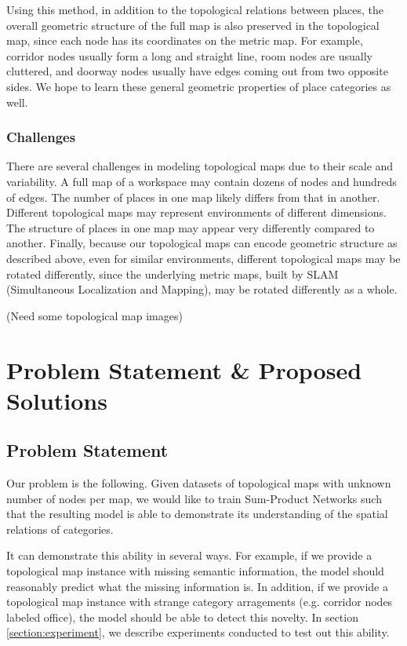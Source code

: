 \documentclass[10pt, titlepage]{article}
\theoremstyle{definition}
\begin{document}
Using this method, in addition to the topological relations between places, the overall geometric structure of the full map is also preserved in the topological map, since each node has its coordinates on the metric map. For example, corridor nodes usually form a long and straight line, room nodes are usually cluttered, and doorway nodes usually have edges coming out from two opposite sides. We hope to learn these general geometric properties of place categories as well.

\subsubsection{Challenges}
There are several challenges in modeling topological maps due to their scale and variability. A full map of a workspace may contain dozens of nodes and hundreds of edges. The number of places in one map likely differs from that in another. Different topological maps may represent environments of different dimensions. The structure of places in one map may appear very differently compared to another. Finally, because our topological maps can encode geometric structure as described above, even for similar environments, different topological maps may be rotated differently, since the underlying metric maps, built by SLAM (Simultaneous Localization and Mapping), may be rotated differently as a whole.

(Need some topological map images)

\section{Problem Statement \& Proposed Solutions}\label{section:sol}
\subsection{Problem Statement}\label{section:problem}

Our problem is the following. Given datasets of topological maps with unknown number of nodes per map, we would like to train Sum-Product Networks such that the resulting model is able to demonstrate its understanding of the spatial relations of categories.

It can demonstrate this ability in several ways. For example, if we provide a topological map instance with missing semantic information, the model should reasonably predict what the missing information is. In addition, if we provide a topological map instance with strange category arragements (e.g. corridor nodes labeled office), the model should be able to detect this novelty. In section \ref{section:experiment}, we describe experiments conducted to test out this ability.
\end{document}

